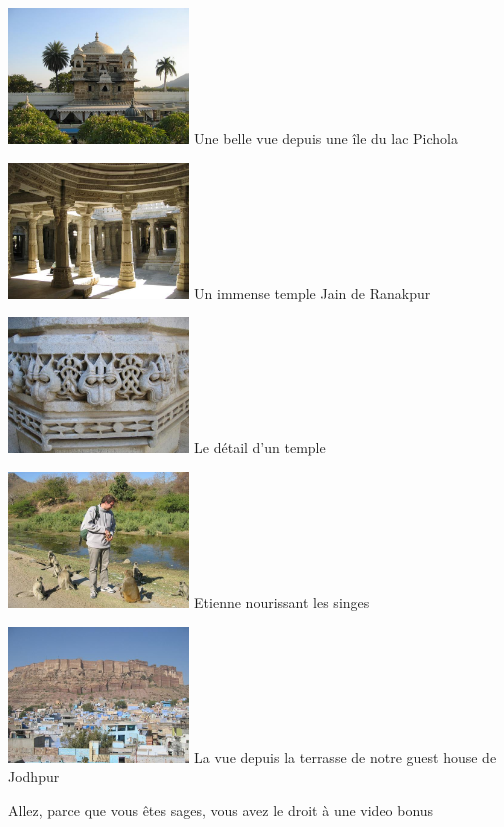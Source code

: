 \begin{multicols}{2}
\hspace*{-0.65cm}
\includegraphics[width=4.8cm]{articles/Il-commence-a-faire-chaud/picchola.jpg}
Une belle vue depuis une île du lac Pichola

\hspace*{-0.65cm}
\includegraphics[width=4.8cm]{articles/Il-commence-a-faire-chaud/ranak.jpg}
Un immense temple Jain de Ranakpur

\hspace*{-0.65cm}
\includegraphics[width=4.8cm]{articles/Il-commence-a-faire-chaud/ranak2.jpg}
Le détail d'un temple

\hspace*{-0.65cm}
\includegraphics[width=4.8cm]{articles/Il-commence-a-faire-chaud/ranak3.jpg}
Etienne nourissant les singes

\hspace*{-0.65cm}
\includegraphics[width=4.8cm]{articles/Il-commence-a-faire-chaud/ranak4.jpg}
La vue depuis la terrasse de notre guest house de Jodhpur

Allez, parce que vous êtes sages, vous avez le droit à une video bonus

\end{multicols}
